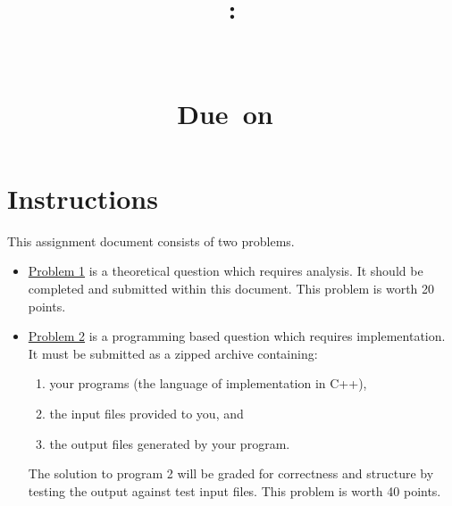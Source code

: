 \documentclass{article}
\title{
	\vspace{2in}
	\textmd{\textbf{\hmwkClass:\\ \hmwkTitle}}\\
	\normalsize\vspace{0.1in}\small{\hmwkClassInstructor}\\
	\normalsize\vspace{0.1in}\small{Due\ on\ \hmwkDueDate}\\
	\vspace{3in}
}
\author{\hmwkAuthorName}
\date{}
\begin{document}
	
\maketitle
	
\pagebreak
\section{Instructions}
This assignment document consists of two problems.

\begin{itemize} 
	\item \underline{Problem 1} is a theoretical question which requires analysis. It should be completed and submitted within this document. This problem is worth 20 points.
	\item \underline{Problem 2} is a programming based question which requires implementation. It must be submitted as a zipped archive containing:
\begin{enumerate}
	\item your programs (the language of implementation in C++), 
	\item the input files provided to you, and
	\item the output files generated by your program. 
\end{enumerate}

The solution to program 2 will be graded for correctness and structure by testing the output against test input files. This problem is worth 40 points.

\end{itemize}
\newpage
\end{document}
